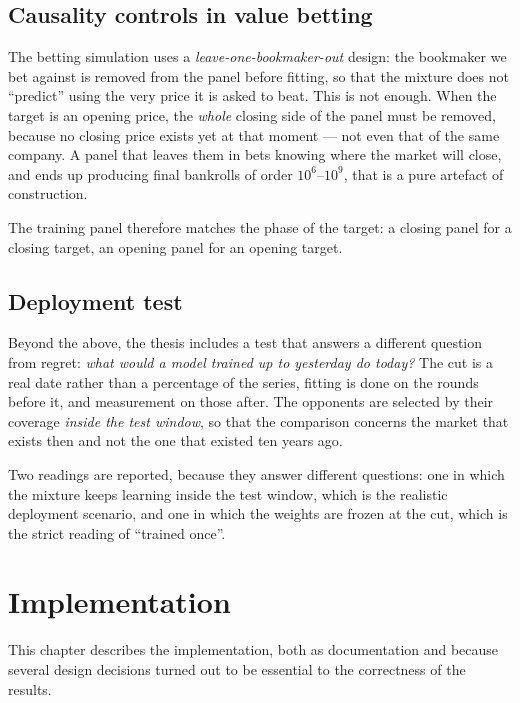 \documentclass[12pt,a4paper,oneside]{report}
\renewcommand{\_}{\oldunderscore\allowbreak}
\theoremstyle{definition}
\theoremstyle{plain}
\theoremstyle{remark}
\begin{document}
\section{Causality controls in value betting}

The betting simulation uses a \emph{leave-one-bookmaker-out} design: the bookmaker we bet against
is removed from the panel before fitting, so that the mixture does not ``predict'' using the very
price it is asked to beat. This is not enough. When the target is an opening price, the
\emph{whole} closing side of the panel must be removed, because no closing price exists yet at
that moment --- not even that of the same company. A panel that leaves them in bets knowing where
the market will close, and ends up producing final bankrolls of order $10^6$--$10^9$, that is a
pure artefact of construction.

The training panel therefore matches the phase of the target: a closing panel for a closing
target, an opening panel for an opening target.

\section{Deployment test}

Beyond the above, the thesis includes a test that answers a different question from regret:
\emph{what would a model trained up to yesterday do today?} The cut is a real date rather than a
percentage of the series, fitting is done on the rounds before it, and measurement on those
after. The opponents are selected by their coverage \emph{inside the test window}, so that the
comparison concerns the market that exists then and not the one that existed ten years ago.

Two readings are reported, because they answer different questions: one in which the mixture
keeps learning inside the test window, which is the realistic deployment scenario, and one in
which the weights are frozen at the cut, which is the strict reading of ``trained once''.

\chapter{Implementation}
\label{ch:impl}

This chapter describes the implementation, both as documentation and because several design
decisions turned out to be essential to the correctness of the results.
\end{document}
